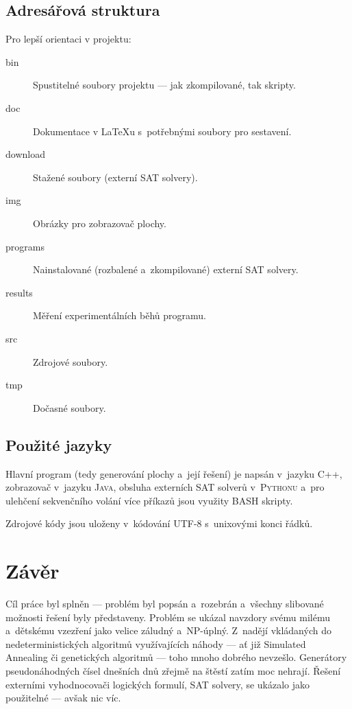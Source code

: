 \documentclass[11pt, titlepage]{report}
\begin{document}
\section{Adresářová struktura}
\label{sec:ovladani-adresare}

\noindent Pro lepší orientaci v projektu:

\begin{description}
\item[bin] Spustitelné soubory projektu --- jak zkompilované, tak skripty.
\item[doc] Dokumentace v {\LaTeX}u s~potřebnými soubory pro sestavení.
\item[download] Stažené soubory (externí SAT solvery).
\item[img] Obrázky pro zobrazovač plochy.
\item[programs] Nainstalované (rozbalené a~zkompilované) externí SAT solvery.
\item[results] Měření experimentálních běhů programu.
\item[src] Zdrojové soubory.
\item[tmp] Dočasné soubory.
\end{description}

\section{Použité jazyky}
\label{sec:ovladani-jazyky}

Hlavní program (tedy generování plochy a~její řešení) je napsán v~jazyku \textsc{C++}, zobrazovač v~jazyku \textsc{Java}, obsluha externích SAT solverů v~\textsc{Pythonu} a~pro ulehčení sekvenčního volání více příkazů jsou využity \textsc{BASH} skripty.

Zdrojové kódy jsou uloženy v~kódování \textsc{UTF-8} s~unixovými konci řádků.


\chapter{Závěr}

Cíl práce byl splněn --- problém byl popsán a~rozebrán a~všechny slibované možnosti řešení byly představeny. Problém se ukázal navzdory svému milému a~dětskému vzezření jako velice záludný a~NP-úplný. Z~nadějí vkládaných do nedeterministických algoritmů využívajících náhody --- ať již Simulated Annealing či genetických algoritmů --- toho mnoho dobrého nevzešlo. Generátory pseudonáhodných čísel dnešních dnů zřejmě na štěstí zatím moc nehrají. Řešení externími vyhodnocovači logických formulí, SAT solvery, se ukázalo jako použitelné --- avšak nic víc.
\end{document}
